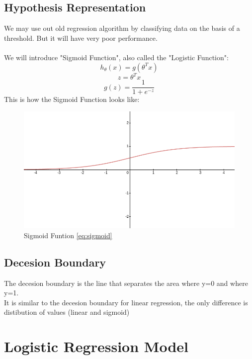\documentclass[12pt]{report}
\begin{document}
  \subsection{Hypothesis Representation}
    We may use out old regression algorithm by classifying data on the basis of a threshold. But it will have very poor performance.\\ 
    \\We will introduce "Sigmoid Function", also called the "Logistic Function":
    \begin{equation}
      h_\theta(x) = g(\theta^{T}x)
    \end{equation}
    \begin{equation}
      z = \theta^{T}x
    \end{equation}
    \begin{equation}\label{eq:sigmoid}
      g(z) = \frac{1}{1+e^{-z}}
    \end{equation}
    This is how the Sigmoid Function looks like:
    \begin{figure}[h]
      \centering
      \includegraphics[scale = 0.15]{sigmoid.png}
      \caption{Sigmoid Funtion \ref{eq:sigmoid}}
    \end{figure}

  \subsection{Decesion Boundary}
    The decesion boundary is the line that separates the area where y=0 and where y=1.\\
    It is similar to the decesion boundary for linear regression, the only difference is distibution of values (linear and sigmoid)

\section{Logistic Regression Model}
\end{document}
